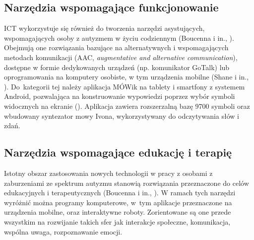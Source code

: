     \subsection{Narzędzia wspomagające funkcjonowanie}
    ICT wykorzystuje się również do tworzenia narzędzi asystujących, wspomagających osoby z autyzmem w życiu codziennym (Boucenna i in., \cite*{boucenna2014interactive}). %
    Obejmują one rozwiązania bazujące na alternatywnych i wspomagających metodach komunikacji (AAC, \emph{augmentative and alternative communication}), dostępne w formie dedykowanych urządzeń (np. komunikator GoTalk) lub oprogramowania na komputery osobiste, w tym urządzenia mobilne (Shane i in., \cite*{shane2012applying}).
    Do~kategorii tej należy aplikacja MÓWik na tablety i smartfony z systemem Android, pozwalająca na konstruowanie wypowiedzi poprzez wybór symboli widocznych na ekranie (\cite{markuc2014wspomaganie}).
    Aplikacja zawiera rozszerzalną bazę 9700 symboli oraz wbudowany syntezator mowy Ivona, wykorzystywany do odczytywania słów i zdań.
    
    \subsection{Narzędzia wspomagające edukację i terapię}
    Istotny obszar zastosowania nowych technologii w pracy z osobami z zaburzeniami ze spektrum autyzmu stanowią rozwiązania przeznaczone do celów edukacyjnych i terapeutycznych (Boucenna i in., \cite*{boucenna2014interactive}).
    W ramach tych narzędzi wyróżnić można programy komputerowe, w~tym aplikacje przeznaczone na urządzenia mobilne, oraz interaktywne roboty.
    Zorientowane są one przede wszystkim na rozwijanie takich sfer jak interakcje społeczne, komunikacja, wspólna uwaga, rozpoznawanie emocji.
    

